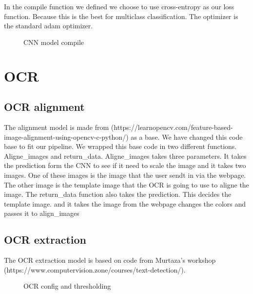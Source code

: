 In the compile function we defined we choose to use cross-entropy as our loss function.
Because this is the best for multiclass classification.
The optimizer is the standard adam optimizer.

\begin{figure}[h]
    \caption{CNN model compile}
    \label{fig:figure4.6}

\end{figure}


\section{OCR}\label{sec:OCR_implementation}

\subsection{OCR alignment}

The alignment model is made from (https://learnopencv.com/feature-based-image-alignment-using-opencv-c-python/) as a base.
We have changed this code base to fit our pipeline.
We wrapped this base code in two different functions.
Aligne\_images and return\_data.
Aligne\_images takes three parameters.
It takes the prediction form the CNN to see if it need to scale the image and it takes two images.
One of these images is the image that the user sendt in via the webpage.
The other image is the template image that the OCR is going to use to aligne the image.
The return\_data function also takes the prediction.
This decides the template image.
and it takes the image from the webpage changes the colors and passes it to align\_images

\subsection{OCR extraction}

The OCR extraction model is based on code from Murtaza's workshop (https://www.computervision.zone/courses/text-detection/).

\begin{figure}[h]
    \caption{OCR config and thresholding}
    \label{fig:figure4.7}
\end{figure}

